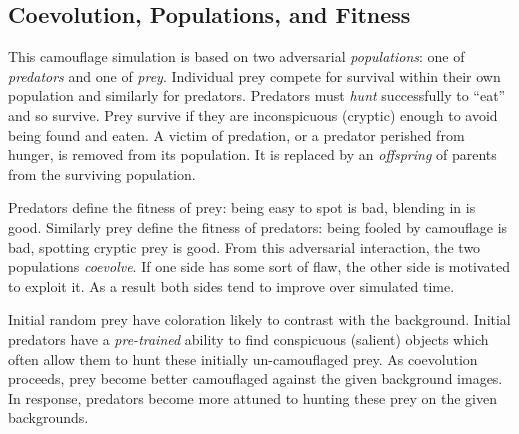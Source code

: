 \documentclass[letterpaper]{article}
\newcommand{\jargon}[1]{\textit{#1}}
\begin{document}
\subsection{Coevolution, Populations, and Fitness}
This camouflage simulation is based on two adversarial \jargon{populations}: one of \jargon{predators} and one of \jargon{prey}. Individual prey compete for survival within their own population and similarly for predators. Predators must \jargon{hunt} successfully to “eat” and so survive. Prey survive if they are inconspicuous (cryptic) enough to avoid being found and eaten. A victim of predation, or a predator perished from hunger, is removed from its population. It is replaced by an \jargon{offspring} of parents from the surviving population.
\par
Predators define the fitness of prey: being easy to spot is bad, blending in is good. Similarly prey define the fitness of predators: being fooled by camouflage is bad, spotting cryptic prey is good. From this adversarial interaction, the two populations \jargon{coevolve}. If one side has some sort of flaw, the other side is motivated to exploit it. As a result both sides tend to improve over simulated time.
\par
Initial random prey have coloration likely to contrast with the background. Initial predators have a \jargon{pre-trained} ability to find conspicuous (salient) objects which often allow them to hunt these initially un-camouflaged prey. As coevolution proceeds, prey become better camouflaged against the given background images. In response, predators become more attuned to hunting these prey on the given backgrounds.
\par

\end{document}
